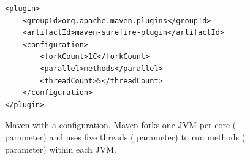 \begin{figure}[h!]
\centering
\scriptsize
{}
\begin{lstlisting}
<plugin>
    <groupId>org.apache.maven.plugins</groupId>
    <artifactId>maven-surefire-plugin</artifactId>
    <configuration>
        <forkCount>1C</forkCount>
        <parallel>methods</parallel>
        <threadCount>5</threadCount>
    </configuration>
</plugin>
\end{lstlisting}
    \caption{\label{fig:surefire} Maven with a \ForkParMeth{}
    configuration.  Maven forks one JVM per core (
    parameter) and uses five threads ( parameter)
    to run methods ( parameter) within each JVM.}
    
\end{figure}





